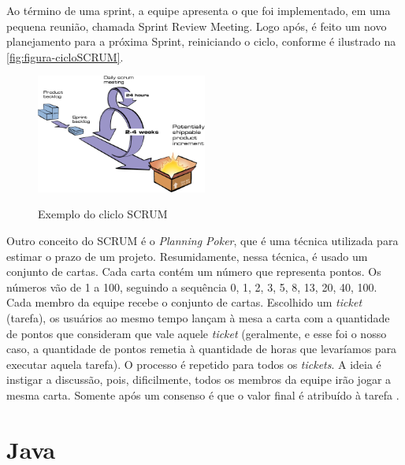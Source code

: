 Ao término de uma sprint, a equipe apresenta o que foi implementado, em uma pequena reunião, chamada Sprint Review Meeting. Logo após, é feito um novo planejamento para a próxima Sprint, reiniciando o ciclo, conforme é ilustrado na \autoref{fig:figura-cicloSCRUM}.


\begin{figure}[!htb]
    \centering
    \caption{Exemplo do cliclo SCRUM}
    \includegraphics[width=0.5\textwidth]{./dados/figuras/cicloSCRUM}
    \label{fig:figura-cicloSCRUM}
\end{figure}

Outro conceito do SCRUM é o \textit{Planning Poker}, que é uma técnica utilizada para estimar o prazo de um projeto. Resumidamente, nessa técnica, é usado um conjunto de cartas. Cada carta contém um número que representa pontos. Os números vão de 1 a 100, seguindo a sequência 0, 1, 2, 3, 5, 8, 13, 20, 40, 100. Cada membro da equipe recebe o conjunto de cartas. Escolhido um \textit{ticket} (tarefa), os usuários ao mesmo tempo lançam à mesa a carta com a quantidade de pontos que consideram que vale aquele \textit{ticket} (geralmente, e esse foi o nosso caso, a quantidade de pontos remetia à quantidade de horas que levaríamos para executar aquela tarefa). O processo é repetido para todos os \textit{tickets}. A ideia é instigar a discussão, pois, dificilmente, todos os membros da equipe irão jogar a mesma carta. Somente após um consenso é que o valor final é atribuído à tarefa \cite{Sabbagh2014}.

\section{Java}
\label{sec:embasamentoTeoricoJava}

